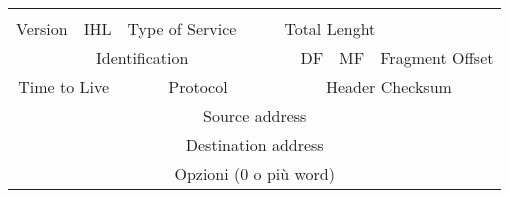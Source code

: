             \begin{tabular}{|l|l|l|l|l|l|l|l|l|l|l|l|l|l|l|l|l|l|l|l|l|l|l|l|l|l|l|l|l|l|l|l|}
                \hline
                & & & & & & & & & & & & & & & & & & & & & & & & & & & & & & & \\
                \hline
                \multicolumn{32}{l}{} \\
                \hline
                \multicolumn{4}{|c|}{Version} & \multicolumn{4}{|c|}{IHL} & \multicolumn{6}{|c|}{Type of Service} & & & \multicolumn{16}{|l|}{Total Lenght}\\
                \hline
                \multicolumn{16}{|c|}{Identification} & & DF & MF & \multicolumn{13}{|c|}{Fragment Offset} \\
                \hline
                \multicolumn{8}{|c|}{Time to Live} & \multicolumn{8}{|c|}{Protocol} & \multicolumn{16}{|c|}{Header Checksum}\\
                \hline
                \multicolumn{32}{|c|}{Source address}\\
                \hline
                \multicolumn{32}{|c|}{Destination address}\\
                \hline
                \multicolumn{32}{|c|}{Opzioni (0 o più word)}\\
                \hline
            \end{tabular}

